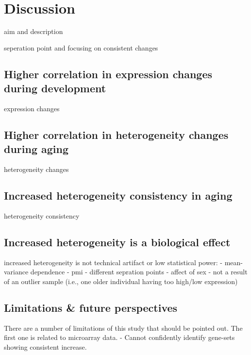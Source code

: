 \chapter{Discussion}
\label{chp:b4}

aim and description 

seperation point and focusing on consistent changes

\section{Higher correlation in expression changes during development}

expression changes

\section{Higher correlation in heterogeneity changes during aging}
heterogeneity changes

\section{Increased heterogeneity consistency in aging}
heterogeneity consistency

\section{Increased heterogeneity is a biological effect}
increased heterogeneity is not technical artifact or low statistical power:
- mean-variance dependence
- pmi
- different sepration points
- affect of sex
- not a result of an outlier sample (i.e., one older individual having too high/low expression)


\section{Limitations \& future perspectives}
There are a number of limitations of this study that should be pointed out. The first one is related to microarray data. 
- Cannot confidently identify gene-sets showing consistent increase.


